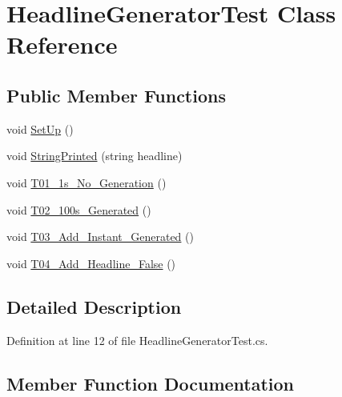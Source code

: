 \hypertarget{class_headline_generator_test}{}\section{Headline\+Generator\+Test Class Reference}
\label{class_headline_generator_test}
\subsection*{Public Member Functions}
\begin{DoxyCompactItemize}
\item 
void \hyperlink{class_headline_generator_test_a9c704e9b06ab1934a7d996521a8ee27a}{Set\+Up} ()
\item 
void \hyperlink{class_headline_generator_test_ad24bb9e052df951b99154205d87739b6}{String\+Printed} (string headline)
\item 
void \hyperlink{class_headline_generator_test_aeb66376e068bbe5f7f4d6b5fac538621}{T01\+\_\+1s\+\_\+\+No\+\_\+\+Generation} ()
\item 
void \hyperlink{class_headline_generator_test_a5a84e69bff5836d9da8a49f21a28b3ee}{T02\+\_\+100s\+\_\+\+Generated} ()
\item 
void \hyperlink{class_headline_generator_test_ab4587f25931a129c564771b5d9cdb687}{T03\+\_\+\+Add\+\_\+\+Instant\+\_\+\+Generated} ()
\item 
void \hyperlink{class_headline_generator_test_a2dcfa9eb081393182afeb3da57591add}{T04\+\_\+\+Add\+\_\+\+Headline\+\_\+\+False} ()
\end{DoxyCompactItemize}


\subsection{Detailed Description}


Definition at line 12 of file Headline\+Generator\+Test.\+cs.



\subsection{Member Function Documentation}
\mbox{\label{class_headline_generator_test_a9c704e9b06ab1934a7d996521a8ee27a}} 
